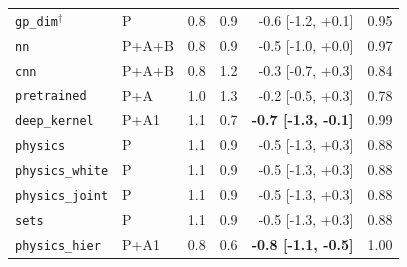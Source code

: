 \begin{tabular}{llrrrl}
\texttt{gp\_dim}$^{\dagger}$ & P & 0.8 & 0.9 & -0.6 [-1.2, +0.1] & 0.95 \\
\texttt{nn} & P+A+B & 0.8 & 0.9 & -0.5 [-1.0, +0.0] & 0.97 \\
\texttt{cnn} & P+A+B & 0.8 & 1.2 & -0.3 [-0.7, +0.3] & 0.84 \\
\texttt{pretrained} & P+A & 1.0 & 1.3 & -0.2 [-0.5, +0.3] & 0.78 \\
\texttt{deep\_kernel} & P+A1 & 1.1 & 0.7 & \textbf{-0.7 [-1.3, -0.1]} & 0.99 \\
\texttt{physics} & P & 1.1 & 0.9 & -0.5 [-1.3, +0.3] & 0.88 \\
\texttt{physics\_white} & P & 1.1 & 0.9 & -0.5 [-1.3, +0.3] & 0.88 \\
\texttt{physics\_joint} & P & 1.1 & 0.9 & -0.5 [-1.3, +0.3] & 0.88 \\
\texttt{sets} & P & 1.1 & 0.9 & -0.5 [-1.3, +0.3] & 0.88 \\
\texttt{physics\_hier} & P+A1 & 0.8 & 0.6 & \textbf{-0.8 [-1.1, -0.5]} & 1.00 \\
\bottomrule
\end{tabular}
